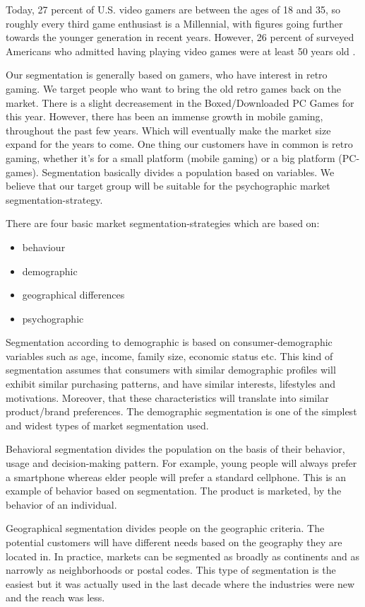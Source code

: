 \documentclass[12p]{article}
\begin{document}
\newpage
Today, 27 percent of U.S. video gamers are between the ages of 18 and 35, so roughly every third game enthusiast is a Millennial, with figures going further towards the younger generation in recent years. However, 26 percent of surveyed Americans who admitted having playing video games were at least 50 years old \cite{VideoGamerGender}.

Our segmentation is generally based on gamers, who have interest in retro gaming. We target people who want to bring the old retro games back on the market. There is a slight decreasement in the Boxed/Downloaded PC Games for this year. However, there has been an immense growth in mobile gaming, throughout the past few years. Which will eventually make the market size expand for the years to come. One thing our customers have in common is retro gaming, whether it's for a small platform (mobile gaming) or a big platform (PC-games). Segmentation basically divides a population based on variables. We believe that our target group will be suitable for the psychographic market segmentation-strategy. 

\newpage
There are four basic market segmentation-strategies which are based on: 

\begin{itemize}
    \item behaviour
    \item demographic
    \item geographical differences
    \item psychographic
\end{itemize}

Segmentation according to demographic is based on consumer-demographic variables such as age, income, family size, economic status etc. This kind of segmentation assumes that consumers with similar demographic profiles will exhibit similar purchasing patterns, and have similar interests, lifestyles and motivations. Moreover, that these characteristics will translate into similar product/brand preferences. The demographic segmentation is one of the simplest and widest types of market segmentation used. 

Behavioral segmentation divides the population on the basis of their behavior, usage and decision-making pattern. For example, young people will always prefer a smartphone whereas elder people will prefer a standard cellphone. This is an example of behavior based on segmentation. The product is marketed, by the behavior of an individual. 

Geographical segmentation divides people on the geographic criteria. The potential customers will have different needs based on the geography they are located in. In practice, markets can be segmented as broadly as continents and as narrowly as neighborhoods or postal codes. This type of segmentation is the easiest but it was actually used in the last decade where the industries were new and the reach was less.
\end{document}
